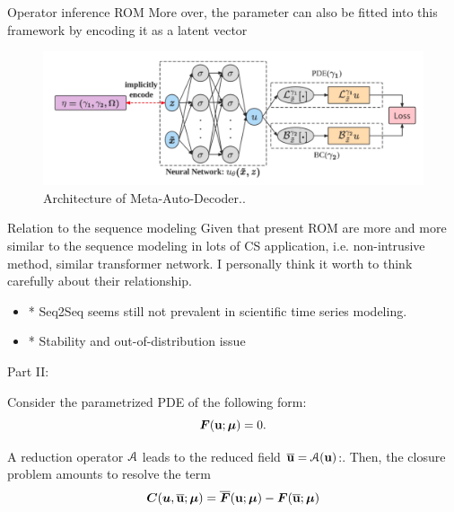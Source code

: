 \documentclass{beamer}
\begin{document}
\begin{frame}{Operator inference ROM}
	More over, the parameter can also be fitted into this framework by encoding it as a latent vector\footnotemark
	\begin{figure}[ht]
		\centering
		\centerline{\includegraphics[width=\linewidth]{fig/MAD.png}}
		\caption{
		Architecture of Meta-Auto-Decoder..\footnotemark}
\end{figure}
\end{frame}

\begin{frame}{Relation to the sequence modeling}
	Given that present ROM are more and more similar to the sequence modeling in lots of CS application, i.e.
	non-intrusive method, similar transformer network. I personally think it worth to think carefully about their
	relationship.
	\begin{itemize}
		\item * Seq2Seq seems still not prevalent in scientific time series modeling.
		\item * Stability and out-of-distribution issue
	\end{itemize}
\end{frame}

\begin{frame}{Part II:}
	
\end{frame}

\begin{frame}
	Consider the parametrized PDE of the following form:
	\begin{equation*}
		\bm{F}(\mathbf{u}; \bm{\mu}) = 0.
	\end{equation*}

	A reduction operator $\mathcal{A}$ leads to the reduced field $\overline{\mathbf{u}}
	= \mathcal{A}(\mathbf{u})$:. Then, the closure problem amounts to resolve the term
	\begin{equation*}
		\bm{C}(\bm{u}, \overline{\mathbf{u}}; \bm{\mu}) = \overline{\bm{F}}(\mathbf{u}; \bm{\mu}) -
		 \bm{F}(\overline{\mathbf{u}}; \bm{\mu})
	\end{equation*}
\end{frame}
\end{document}
